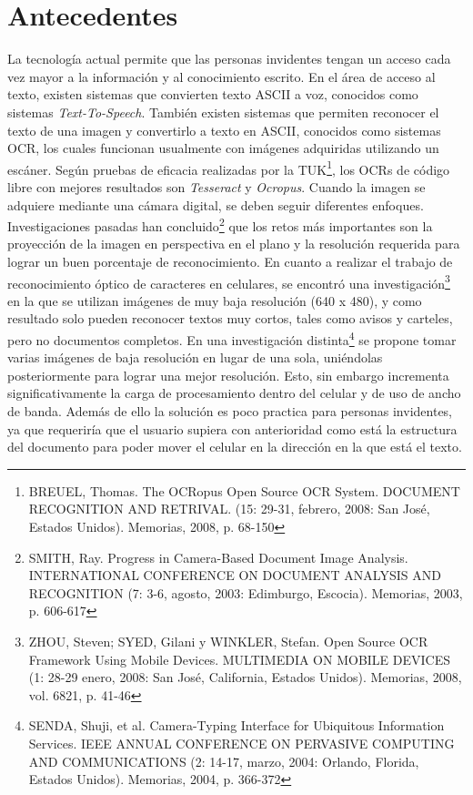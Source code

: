 \documentclass[a4paper, 11pt, oneside]{report}
\begin{document}
\section {Antecedentes}
La tecnología actual permite que las personas invidentes tengan un acceso cada vez mayor a la información y al conocimiento escrito. En el área de acceso al texto, existen sistemas que convierten texto ASCII a voz, conocidos como sistemas \textit{Text-To-Speech}. También existen sistemas que permiten reconocer el texto de una imagen y convertirlo a texto en ASCII, conocidos como sistemas OCR, los cuales funcionan usualmente con imágenes adquiridas utilizando un escáner. Según pruebas de eficacia realizadas por la TUK\footnote{BREUEL, Thomas. The OCRopus Open Source OCR System. DOCUMENT RECOGNITION AND RETRIVAL. (15: 29-31, febrero, 2008: San José, Estados Unidos). Memorias, 2008, p. 68-150}, los OCRs de código libre con mejores resultados son \textit{Tesseract} y \textit{Ocropus}. Cuando la imagen se adquiere mediante una cámara digital, se deben seguir diferentes enfoques. Investigaciones pasadas han concluido\footnote{SMITH, Ray. Progress in Camera-Based Document Image Analysis. INTERNATIONAL CONFERENCE ON DOCUMENT ANALYSIS AND RECOGNITION (7: 3-6, agosto, 2003: Edimburgo, Escocia). Memorias, 2003, p. 606-617} que los retos más importantes son la proyección de la imagen en perspectiva en el plano y la resolución requerida para lograr un buen porcentaje de reconocimiento.
En cuanto a realizar el trabajo de reconocimiento óptico de caracteres en celulares, se encontró una investigación\footnote{ZHOU, Steven; SYED, Gilani y WINKLER, Stefan. Open Source OCR Framework Using Mobile Devices. MULTIMEDIA ON MOBILE DEVICES (1: 28-29 enero, 2008: San José, California, Estados Unidos). Memorias, 2008, vol. 6821, p. 41-46} en la que se utilizan imágenes de muy baja resolución (640 x 480), y como resultado solo pueden reconocer textos muy cortos, tales como avisos y carteles, pero no documentos completos. En una investigación distinta\footnote{SENDA, Shuji, et al. Camera-Typing Interface for Ubiquitous Information Services. IEEE ANNUAL CONFERENCE ON PERVASIVE COMPUTING AND COMMUNICATIONS (2: 14-17, marzo, 2004: Orlando, Florida, Estados Unidos). Memorias, 2004, p. 366-372} se propone tomar varias imágenes de baja resolución en lugar de una sola, uniéndolas posteriormente para lograr una mejor resolución. Esto, sin embargo incrementa significativamente la carga de procesamiento dentro del celular y de uso de ancho de banda. Además de ello la solución es poco practica para personas invidentes, ya que requeriría que el usuario supiera con anterioridad como está la estructura del documento para poder mover el celular en la dirección en la que está el texto.
\end{document}
